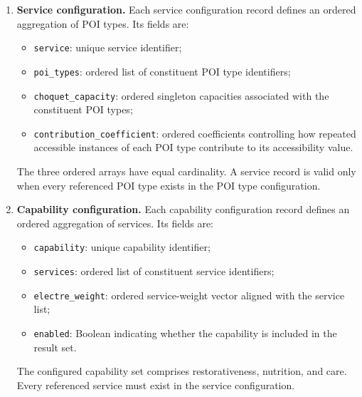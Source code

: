 \begin{enumerate}
    \item \textbf{Service configuration.}
    Each service configuration record defines an ordered aggregation of POI
    types. Its fields are:
    \begin{itemize}
        \item \texttt{service}: unique service identifier;
        \item \texttt{poi\_types}: ordered list of constituent POI type
        identifiers;
        \item \texttt{choquet\_capacity}: ordered singleton capacities
        associated with the constituent POI types;
        \item \texttt{contribution\_coefficient}: ordered coefficients
        controlling how repeated accessible instances of each POI type
        contribute to its accessibility value.
    \end{itemize}
    The three ordered arrays have equal cardinality. A service record is valid
    only when every referenced POI type exists in the POI type configuration.

    \item \textbf{Capability configuration.}
    Each capability configuration record defines an ordered aggregation of
    services. Its fields are:
    \begin{itemize}
        \item \texttt{capability}: unique capability identifier;
        \item \texttt{services}: ordered list of constituent service
        identifiers;
        \item \texttt{electre\_weight}: ordered service-weight vector aligned
        with the service list;
        \item \texttt{enabled}: Boolean indicating whether the capability is
        included in the result set.
    \end{itemize}
    The configured capability set comprises restorativeness, nutrition, and
    care. Every referenced service must exist in the service configuration.
\end{enumerate}

